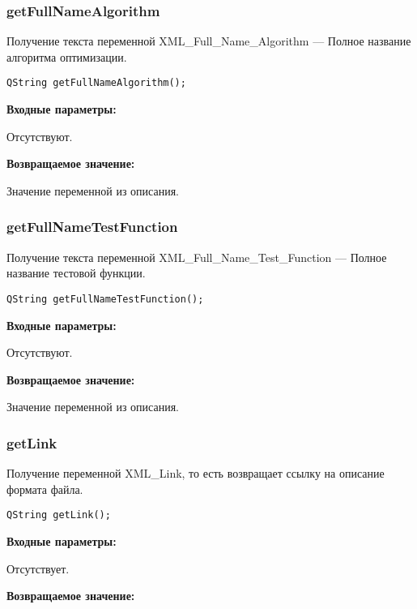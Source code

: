 \documentclass[a4paper,12pt]{article}
\begin{document}
\subsubsection{getFullNameAlgorithm}\label{getFullNameAlgorithm}

Получение текста переменной  XML\_Full\_Name\_Algorithm --- Полное название алгоритма оптимизации.


\begin{lstlisting}[label=code_syntax_getFullNameAlgorithm,caption=Синтаксис]
QString getFullNameAlgorithm();
\end{lstlisting}

\textbf{Входные параметры:}

Отсутствуют.

\textbf{Возвращаемое значение:}

Значение переменной из описания.


\subsubsection{getFullNameTestFunction}\label{getFullNameTestFunction}

Получение текста переменной  XML\_Full\_Name\_Test\_Function --- Полное название тестовой функции.


\begin{lstlisting}[label=code_syntax_getFullNameTestFunction,caption=Синтаксис]
QString getFullNameTestFunction();
\end{lstlisting}

\textbf{Входные параметры:}

Отсутствуют.

\textbf{Возвращаемое значение:}

Значение переменной из описания.


\subsubsection{getLink}\label{getLink}

Получение переменной XML\_Link, то есть возвращает ссылку на описание формата файла.


\begin{lstlisting}[label=code_syntax_getLink,caption=Синтаксис]
QString getLink();
\end{lstlisting}

\textbf{Входные параметры:}

Отсутствует.

\textbf{Возвращаемое значение:}
\end{document}
